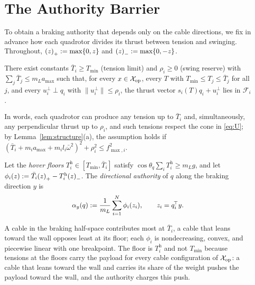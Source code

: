 \section{The Authority Barrier}\label{sec:theory}

To obtain a braking authority that depends only on the cable directions, we fix in advance how each quadrotor divides its thrust between tension and swinging. Throughout, ${(z)}_{+}:=\max\{0,z\}$ and ${(z)}_{-}:=\max\{0,-z\}$.

\begin{assumption}\label{ass:split}
There exist constants $\bar T_i\ge T_{\min}$ (tension limit) and $\rho_i\ge 0$ (swing reserve) with $\sum_j\bar T_j\le m_La_{\max}$ such that, for every $x\in\mathcal{X}_{\mathrm{op}}$, every $T$ with $T_{\min}\le T_j\le\bar T_j$ for all $j$, and every $u_i^\perp\perp q_i$ with $\|u_i^\perp\|\le\rho_i$, the thrust vector $s_i(T)q_i+u_i^\perp$ lies in $\mathcal{F}_i$.
\end{assumption}

In words, each quadrotor can produce any tension up to $\bar T_i$ and, simultaneously, any perpendicular thrust up to $\rho_i$, and such tensions respect the cone in \eqref{eq:U}; by Lemma~\ref{lem:structure}(a), the assumption holds if $(\bar T_i+m_ia_{\max}+m_il_i\bar\omega^2)^2+\rho_i^2\le f_{\max,i}^2$.

\begin{definition}\label{def:authority}
Let the \emph{hover floors} $T^{\mathrm h}_i\in[T_{\min},\bar T_i]$ satisfy $\cos\theta_q\sum_iT^{\mathrm h}_i\ge m_Lg$, and let $\phi_i(z):=\bar T_i{(z)}_{+}-T^{\mathrm h}_i{(z)}_{-}$. The \emph{directional authority} of $q$ along the braking direction $y$ is
\begin{equation}
\alpha_y(q):=\frac{1}{m_L}\sum_{i=1}^{N}\phi_i(z_i),\qquad z_i=q_i^{\!\top} y.
\label{eq:authority}
\end{equation}
\end{definition}

A cable in the braking half-space contributes most at $\bar T_i$, a cable that leans toward the wall opposes least at its floor; each $\phi_i$ is nondecreasing, convex, and piecewise linear with one breakpoint. The floor is $T^{\mathrm h}_i$ and not $T_{\min}$ because tensions at the floors carry the payload for every cable configuration of $\mathcal{X}_{\mathrm{op}}$: a cable that leans toward the wall and carries its share of the weight pushes the payload toward the wall, and the authority charges this push.

